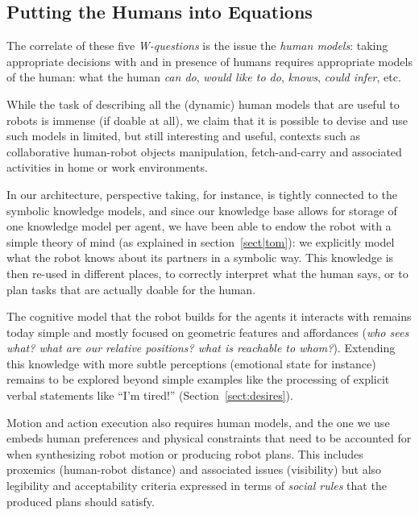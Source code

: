 \documentclass[preprint,3p,times]{elsarticle}
\begin{document}

\subsection{Putting the Humans into Equations}

The correlate of these five \emph{W-questions} is the issue the \emph{human
models}: taking appropriate decisions with and in presence of humans requires
appropriate models of the human: what the human \emph{can do}, \emph{would like
to do}, \emph{knows}, \emph{could infer}, etc.

While the task of describing all the (dynamic) human models that are useful to
robots is immense (if doable at all), we claim that it is possible to devise and
use such models in limited, but still interesting and useful, contexts such as
collaborative human-robot objects manipulation, fetch-and-carry and associated
activities in home or work environments.

In our architecture, perspective taking, for instance, is tightly connected to
the symbolic knowledge models, and since our knowledge base allows for storage
of one knowledge model per agent, we have been able to endow the robot with a
simple theory of mind (as explained in section~\ref{sect|tom}): we explicitly
model what the robot knows about its partners in a symbolic way. This knowledge
is then re-used in different places, to correctly interpret what the human says,
or to plan tasks that are actually doable for the human.

The cognitive model that the robot builds for the agents it interacts with
remains today simple and mostly focused on geometric features and affordances
(\emph{who sees what? what are our relative positions? what is reachable to
whom?}). Extending this knowledge with more subtle perceptions (emotional
state for instance) remains to be explored beyond simple examples like the
processing of explicit verbal statements like ``I'm tired!''
(Section~\ref{sect:desires}).

Motion and action execution also requires human models, and the one we use
embeds human preferences and physical constraints that need to be accounted for
when synthesizing robot motion or producing robot plans. This includes
proxemics (human-robot distance) and associated issues (visibility) but also
legibility and acceptability criteria expressed in terms of \emph{social rules}
that the produced plans should satisfy.
\end{document}
